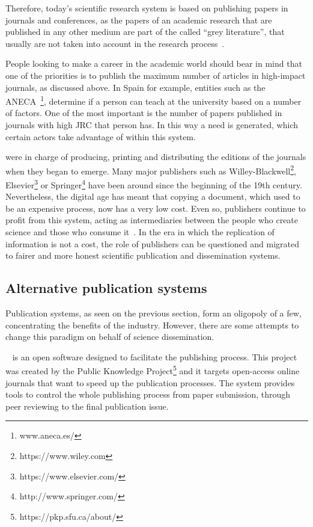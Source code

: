 Therefore, today's scientific research system is based on publishing papers in
journals and conferences, as the papers of an academic research that are
published in any other medium are part of the called ``grey literature'', that
usually are not taken into account in the research
process~\cite{rothstein2009grey}.

People looking to make a career in the academic world should bear in mind that
one of the priorities is to publish the maximum number of articles in
high-impact journals, as discussed above. In Spain for example, entities such as
the ANECA~\footnote{www.aneca.es/}, determine if a person can teach at the
university based on a number of factors. One of the most important is the number
of papers published in journals with high JRC that person has. In this way a
need is generated, which certain actors take advantage of within this system.

 were in charge of producing, printing and distributing the
editions of the journals when they began to emerge. Many major publishers such
as Willey-Blackwell\footnote{https://www.wiley.com},
Elsevier\footnote{https://www.elsevier.com/} or
Springer\footnote{http://www.springer.com/} have been around since the beginning
of the 19th century. Nevertheless, the digital age has meant that copying a
document, which used to be an expensive process, now has a very low cost. Even
so, publishers continue to profit from this system, acting as intermediaries
between the people who create science and those who consume
it~\cite{lariviere2015oligopoly}. In the era in which the replication of
information is not a cost, the role of publishers can be questioned and migrated
to fairer and more honest scientific publication and dissemination systems.

\subsection{Alternative publication systems}
\label{soa:aps}
Publication systems, as seen on the previous section, form an oligopoly of a
few, concentrating the benefits of the industry. However, there are some
attempts to change this paradigm on behalf of science dissemination.

~\cite{willinsky2005open} is an open software designed
to facilitate the publishing process. This project was created by the Public
Knowledge Project\footnote{https://pkp.sfu.ca/about/} and it targets open-access
online journals that want to speed up the publication processes. The system
provides tools to control the whole publishing process from paper submission,
through peer reviewing to the final publication issue.

